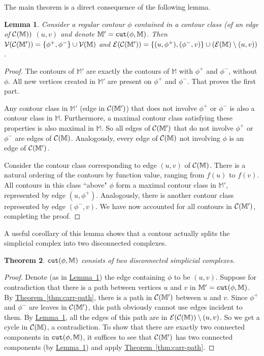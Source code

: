 \documentclass[11pt]{article}
\newtheorem{theorem}{Theorem}
\newtheorem{lemma}[theorem]{Lemma}
\theoremstyle{definition}
\newcommand{\cC}{{\cal C}}
\newcommand{\cE}{{\cal E}}
\newcommand{\cV}{{\cal V}}
\newcommand{\MM}{\mathbb{M}}
\newcommand{\Thm}[1]{\hyperref[thm:#1]{Theorem~\ref*{thm:#1}}} %
\newcommand{\Lem}[1]{\hyperref[lem:#1]{Lemma~\ref*{lem:#1}}} %
\newcommand{\cut}{{\tt cut}}
\newcommand{\reeb}{\cC}
\begin{document}
The main theorem is a direct consequence of the following lemma. 

\begin{lemma} \label{lem:cut} Consider a regular contour $\phi$ contained in a contour class (of an edge of $\reeb(\MM))$
$(u,v)$ and denote $\MM' = \cut(\phi,\MM)$. Then $\cV(\reeb(\MM')) = \{\phi^+,\phi^-\} \cup \cV(\MM)$
and $\cE(\reeb(\MM')) = \{(u,\phi^+),(\phi^-,v)\} \cup (\cE(\MM) \setminus (u,v))$.
\end{lemma}

\begin{proof} The contours of $\MM'$ are exactly the contours of $\MM$ with $\phi^+$ and $\phi^-$, without $\phi$.
All new vertices created in $\MM'$ are present on $\phi^+$ and $\phi^-$. That proves the first part.

Any contour class in $\MM'$ (edge in $\cC(\MM')$) that does not involve $\phi^+$ or $\phi^-$ is also
a contour class in $\MM$. Furthermore, a maximal contour class satisfying these properties is also
maximal in $\MM$. So all edges of $\cC(\MM')$ that do not involve $\phi^+$ or $\phi^-$ are edges of $\cC(\MM)$.
Analogously, every edge of $\cC(\MM)$ not involving $\phi$ is an edge of $\cC(\MM')$.

Consider the contour class corresponding to edge $(u,v)$ of $\cC(\MM)$. There is a natural ordering
of the contours by function value, ranging from $f(u)$ to $f(v)$. All contours in this class ``above" $\phi$
form a maximal contour class in $\MM'$, represented by edge $(u,\phi^+)$. Analogously, there is another
contour class represented by edge $(\phi^-,v)$. We have now accounted for all contours in $\cC(\MM')$,
completing the proof.
\end{proof}

A useful corollary of this lemma shows that a contour actually splits the simplicial complex into
two disconnected complexes.

\begin{theorem} \label{thm:jordan} $\cut(\phi,\MM)$ consists of two
disconnected simplicial complexes.
\end{theorem}

\begin{proof} Denote (as in \Lem{cut}) the edge containing $\phi$ to be $(u,v)$. Suppose for contradiction that there is a path between vertices $u$ and $v$
in $\MM' = \cut(\phi,\MM)$. By \Thm{carr-path}, there is a path in $\cC(\MM')$ between $u$ and $v$. Since $\phi^+$ and $\phi^-$
are leaves in $\cC(\MM')$, this path obviously cannot use edges incident to them. By \Lem{cut},
all the edges of this path are in $\cE(\cC(\MM)) \setminus (u,v)$. So we get a cycle in $\cC(\MM)$, a contradiction.
To show that there are exactly two connected components in $\cut(\phi,\MM)$, it suffices
to see that $\cC(\MM')$ has two connected components (by \Lem{cut}) and apply \Thm{carr-path}.
\end{proof}
\end{document}
